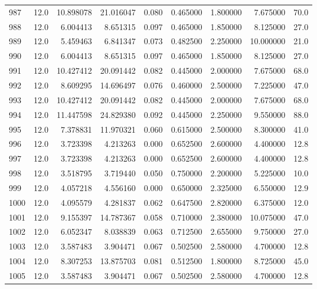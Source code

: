 \begin{tabular}{lrrrrrrrr}
987  &   12.0 &  10.898078 &  21.016047 &  0.080 &  0.465000 &  1.800000 &   7.675000 &   70.0 \\
988  &   12.0 &   6.004413 &   8.651315 &  0.097 &  0.465000 &  1.850000 &   8.125000 &   27.0 \\
989  &   12.0 &   5.459463 &   6.841347 &  0.073 &  0.482500 &  2.250000 &  10.000000 &   21.0 \\
990  &   12.0 &   6.004413 &   8.651315 &  0.097 &  0.465000 &  1.850000 &   8.125000 &   27.0 \\
991  &   12.0 &  10.427412 &  20.091442 &  0.082 &  0.445000 &  2.000000 &   7.675000 &   68.0 \\
992  &   12.0 &   8.609295 &  14.696497 &  0.076 &  0.460000 &  2.500000 &   7.225000 &   47.0 \\
993  &   12.0 &  10.427412 &  20.091442 &  0.082 &  0.445000 &  2.000000 &   7.675000 &   68.0 \\
994  &   12.0 &  11.447598 &  24.829380 &  0.092 &  0.445000 &  2.250000 &   9.550000 &   88.0 \\
995  &   12.0 &   7.378831 &  11.970321 &  0.060 &  0.615000 &  2.500000 &   8.300000 &   41.0 \\
996  &   12.0 &   3.723398 &   4.213263 &  0.000 &  0.652500 &  2.600000 &   4.400000 &   12.8 \\
997  &   12.0 &   3.723398 &   4.213263 &  0.000 &  0.652500 &  2.600000 &   4.400000 &   12.8 \\
998  &   12.0 &   3.518795 &   3.719440 &  0.050 &  0.750000 &  2.200000 &   5.225000 &   10.0 \\
999  &   12.0 &   4.057218 &   4.556160 &  0.000 &  0.650000 &  2.325000 &   6.550000 &   12.9 \\
1000 &   12.0 &   4.095579 &   4.281837 &  0.062 &  0.647500 &  2.820000 &   6.375000 &   12.0 \\
1001 &   12.0 &   9.155397 &  14.787367 &  0.058 &  0.710000 &  2.380000 &  10.075000 &   47.0 \\
1002 &   12.0 &   6.052347 &   8.038839 &  0.063 &  0.712500 &  2.655000 &   9.750000 &   27.0 \\
1003 &   12.0 &   3.587483 &   3.904471 &  0.067 &  0.502500 &  2.580000 &   4.700000 &   12.8 \\
1004 &   12.0 &   8.307253 &  13.875703 &  0.081 &  0.512500 &  1.800000 &   8.725000 &   45.0 \\
1005 &   12.0 &   3.587483 &   3.904471 &  0.067 &  0.502500 &  2.580000 &   4.700000 &   12.8 \\

\end{tabular}
